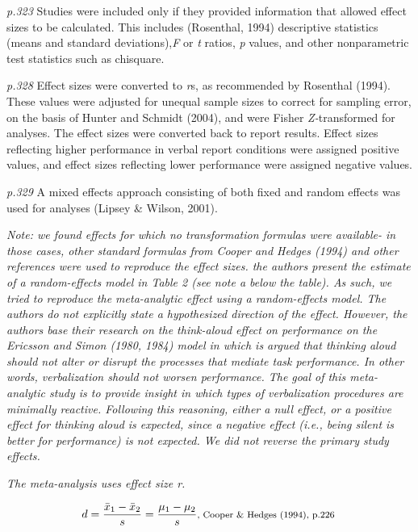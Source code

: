 \documentclass{article}
\begin{document}
\textit{p.323} Studies were included only if they provided information that allowed effect sizes to be calculated. This includes (Rosenthal, 1994) descriptive statistics (means and standard deviations),\textit{F} or \textit{t} ratios, \textit{p} values, and other nonparametric test statistics such as chisquare.

\textit{p.328} Effect sizes were converted to \textit{r}s, as recommended by Rosenthal (1994). These values were adjusted for unequal sample sizes to correct for sampling error, on the basis of Hunter and Schmidt (2004), and were Fisher \textit{Z-}transformed for analyses. The effect sizes were converted back to report results. Effect sizes reflecting higher performance in verbal report conditions were assigned positive values, and effect sizes reflecting lower performance were assigned negative values.

\textit{p.329} A mixed effects approach consisting of both fixed and random effects was used for analyses (Lipsey \& Wilson, 2001).

\vspace{3 mm}
\textit{Note: we found effects for which no transformation formulas were available- in those cases, other standard formulas from Cooper and Hedges (1994) and other references were used to reproduce the effect sizes. the authors present the estimate of a random-effects model in Table 2 (see note a below the table). As such, we tried to reproduce the meta-analytic effect using a random-effects model. The authors do not explicitly state a hypothesized direction of the effect. However, the authors base their research on the think-aloud effect on performance on the Ericsson and Simon (1980, 1984) model in which is argued that thinking aloud should not alter or disrupt the processes that mediate task performance. In other words, verbalization should not worsen performance. The goal of this meta-analytic study is to provide insight in which types of verbalization procedures are minimally reactive. Following this reasoning, either a null effect, or a positive effect for thinking aloud is expected, since a negative effect (i.e., being silent is better for performance) is not expected. We did not reverse the primary study effects.} 

\vspace{3mm}
\textit{The meta-analysis uses effect size r.}

\begin{equation*}
d={\frac {{\bar {x}}_{1}-{\bar {x}}_{2}}{s}}={\frac {\mu_{1}-\mu_{2}}{s}} \mbox{\footnotesize, Cooper \& Hedges (1994), p.226 } 
\end{equation*}
\end{document}
